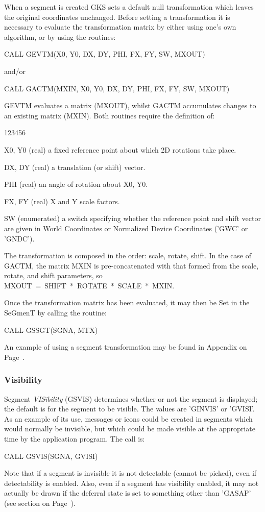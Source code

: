 When a segment is created GKS sets a default null transformation
which leaves the original coordinates unchanged.
Before setting a transformation it is necessary
to evaluate the transformation matrix by either using one's own
algorithm, or by using the routines:
\begin{XMP}
CALL GEVTM(X0, Y0, DX, DY, PHI, FX, FY, SW, MXOUT)
 
     and/or
 
CALL GACTM(MXIN, X0, Y0, DX, DY, PHI, FX, FY, SW, MXOUT)
\end{XMP}
GEVTM evaluates a matrix (MXOUT), whilst GACTM accumulates changes to
an existing matrix (MXIN).
Both routines require the definition of:
\begin{DLtt}{123456}
\item[X0, Y0]
(real) a fixed reference point about which 2D rotations take place.
\item[DX, DY]
(real) a translation (or shift) vector.
\item[PHI]
(real) an angle of rotation about X0, Y0.
\item[FX, FY]
(real) X and Y scale factors.
\item[SW]
(enumerated) a switch specifying whether the reference point and
shift vector are given in World Coordinates
or Normalized Device Coordinates ('GWC' or 'GNDC').
\end{DLtt}
The transformation is composed in the order: scale, rotate, shift.
In the case of GACTM, the matrix MXIN is pre-concatenated with that
formed from the scale, rotate, and shift parameters, so
MXOUT~=~SHIFT~*~ROTATE~*~SCALE~*~MXIN.
 
Once the transformation matrix has been evaluated, it may then be
Set in the SeGmenT by calling the routine:
\begin{XMP}
CALL GSSGT(SGNA, MTX)
\end{XMP}
An example of using a segment transformation may be
found in Appendix on Page~\pageref{sec:ex3dv}.
\subsubsection{Visibility}
 
Segment {\it VISibility} (GSVIS) determines whether or not the
segment is displayed; the default is for the segment to be visible.
The values are 'GINVIS' or 'GVISI'.
As an example of its use, messages or icons could be created in segments
which would normally be invisible, but which could be made visible
at the appropriate time by the application program. The call is:
\begin{XMP}
CALL GSVIS(SGNA, GVISI)
\end{XMP}
Note that if a segment is invisible it is not detectable
(cannot be picked), even if detectability is enabled.
Also, even if a segment has visibility enabled, it may not actually be
drawn if the deferral state is set to something other than 'GASAP'
(see section on Page~\pageref{sec:defsta}).
